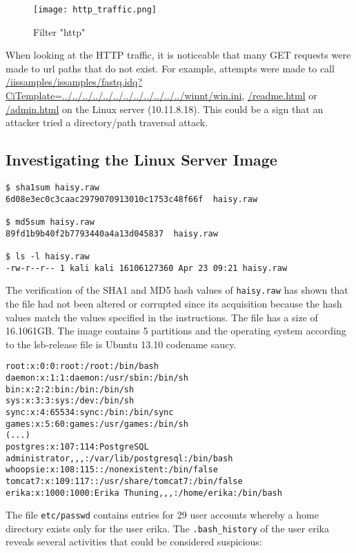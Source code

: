 \begin{figure}[h]
\texttt{[image: http\_traffic.png]}
\centering
\caption{Filter "http"}
\label{screen:http_traffic}
\end{figure}

\noindent When looking at the HTTP traffic, it is noticeable that many GET requests were made to url paths that do not exist. For example, attempts were made to call \url{/iissamples/issamples/fastq.idq?CiTemplate=../../../../../../../../../../../../winnt/win.ini}, \url{/readme.html} or \url{/admin.html} on the Linux server (10.11.8.18). This could be a sign that an attacker tried a directory/path traversal attack.

\newpage
\subsection{Investigating the Linux Server Image}
\begin{verbatim}
$ sha1sum haisy.raw      
6d08e3ec0c3caac2979070913010c1753c48f66f  haisy.raw

$ md5sum haisy.raw      
89fd1b9b40f2b7793440a4a13d045837  haisy.raw

$ ls -l haisy.raw     
-rw-r--r-- 1 kali kali 16106127360 Apr 23 09:21 haisy.raw
\end{verbatim}
The verification of the SHA1 and MD5 hash values of \texttt{haisy.raw} has shown that the file had not been altered or corrupted since its acquisition because the hash values match the values specified in the instructions. The file has a size of 16.1061GB. The image contains 5 partitions and the operating system according to the lsb-release file is Ubuntu 13.10 codename saucy.
\begin{verbatim}
​​root:x:0:0:root:/root:/bin/bash
daemon:x:1:1:daemon:/usr/sbin:/bin/sh
bin:x:2:2:bin:/bin:/bin/sh
sys:x:3:3:sys:/dev:/bin/sh
sync:x:4:65534:sync:/bin:/bin/sync
games:x:5:60:games:/usr/games:/bin/sh
(...)
postgres:x:107:114:PostgreSQL administrator,,,:/var/lib/postgresql:/bin/bash
whoopsie:x:108:115::/nonexistent:/bin/false
tomcat7:x:109:117::/usr/share/tomcat7:/bin/false
erika:x:1000:1000:Erika Thuning,,,:/home/erika:/bin/bash
\end{verbatim}
\noindent The file \texttt{etc/passwd} contains entries for 29 user accounts whereby a home directory exists only for the user erika. The \texttt{.bash\_history} of the user erika reveals several activities that could be considered suspicious:
